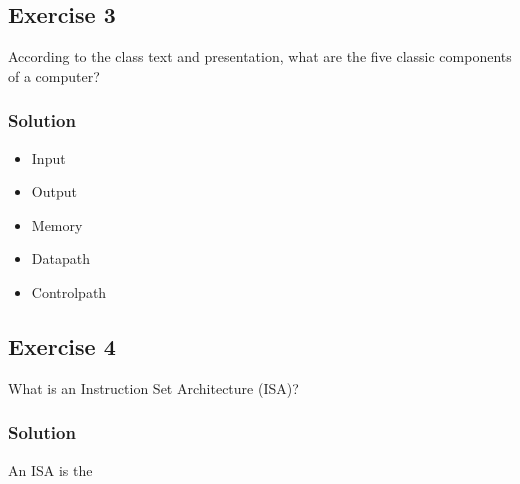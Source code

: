 \documentclass[12pt]{article}
\begin{document}
\subsection*{Exercise 3}
According to the class text and presentation, what are the five classic components of a computer?
\subsubsection*{Solution}
\begin{itemize}
\item Input
\item Output
\item Memory
\item Datapath
\item Controlpath
\end{itemize}

\subsection*{Exercise 4}
What is an Instruction Set Architecture (ISA)?
\subsubsection*{Solution}
An ISA is the 
\end{document}
